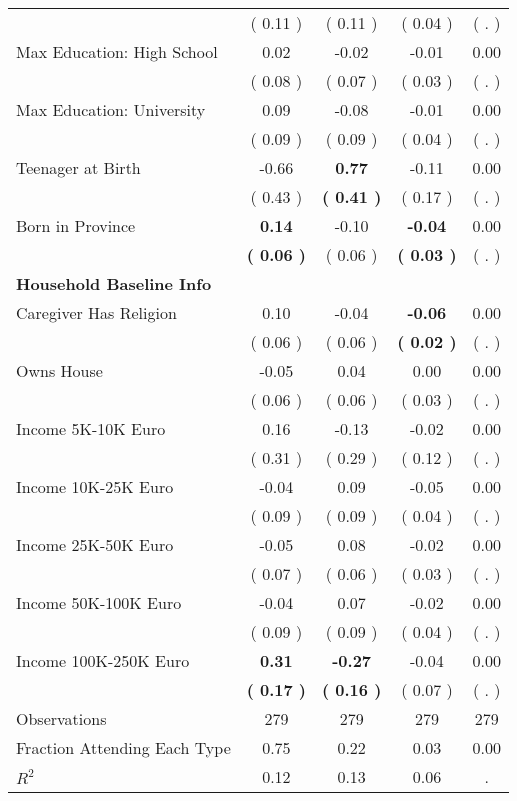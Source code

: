 \begin{table}[H]
{\begin{tabular}{lcccc}
\quad  & (     0.11 ) & (     0.11 )  & (     0.04 )  & (        . )  \\
\quad Max Education: High School &      0.02 &     -0.02 &     -0.01 &      0.00 \\
\quad  & (     0.08 ) & (     0.07 )  & (     0.03 )  & (        . )  \\
\quad Max Education: University &      0.09 &     -0.08 &     -0.01 &      0.00 \\
\quad  & (     0.09 ) & (     0.09 )  & (     0.04 )  & (        . )  \\
\quad Teenager at Birth &     -0.66 & \textbf{     0.77} &     -0.11 &      0.00 \\
\quad  & (     0.43 ) & \textbf{(     0.41 )}  & (     0.17 )  & (        . )  \\
\quad Born in Province & \textbf{     0.14} &     -0.10 & \textbf{    -0.04} &      0.00 \\
\quad  & \textbf{(     0.06 )} & (     0.06 )  & \textbf{(     0.03 )}  & (        . )  \\
\midrule
\textbf{Household Baseline Info} \\
\quad Caregiver Has Religion &      0.10 &     -0.04 & \textbf{    -0.06} &      0.00 \\
\quad  & (     0.06 ) & (     0.06 )  & \textbf{(     0.02 )}  & (        . )  \\
\quad Owns House &     -0.05 &      0.04 &      0.00 &      0.00 \\
\quad  & (     0.06 ) & (     0.06 )  & (     0.03 )  & (        . )  \\
\quad Income 5K-10K Euro &      0.16 &     -0.13 &     -0.02 &      0.00 \\
\quad  & (     0.31 ) & (     0.29 )  & (     0.12 )  & (        . )  \\
\quad Income 10K-25K Euro &     -0.04 &      0.09 &     -0.05 &      0.00 \\
\quad  & (     0.09 ) & (     0.09 )  & (     0.04 )  & (        . )  \\
\quad Income 25K-50K Euro &     -0.05 &      0.08 &     -0.02 &      0.00 \\
\quad  & (     0.07 ) & (     0.06 )  & (     0.03 )  & (        . )  \\
\quad Income 50K-100K Euro &     -0.04 &      0.07 &     -0.02 &      0.00 \\
\quad  & (     0.09 ) & (     0.09 )  & (     0.04 )  & (        . )  \\
\quad Income 100K-250K Euro & \textbf{     0.31} & \textbf{    -0.27} &     -0.04 &      0.00 \\
\quad  & \textbf{(     0.17 )} & \textbf{(     0.16 )}  & (     0.07 )  & (        . )  \\
\midrule
Observations & 279 & 279 & 279 & 279 \\
Fraction Attending Each Type &      0.75 &      0.22 &      0.03 &      0.00 \\
\midrule
$ R^2$ &      0.12 &      0.13 &      0.06 &         . \\
\bottomrule
\end{tabular}}
\end{table}
